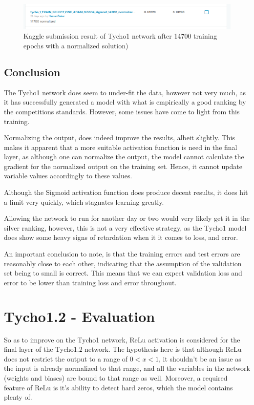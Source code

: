 \documentclass[12pt,a4paper,oneside,oldfontcommands]{memoir}
\begin{document}
\begin{Declaration Of OriginalityOrginality}
\begin{figure}[H]
  \centering
    \includegraphics[width=\linewidth]{images/tycho1_result.png}
    \caption{Kaggle submission result of Tycho1 network after 14700 training epochs with a normalized solution)}
   \label{fig:tycho-1-solution}
\end{figure}

\section{Conclusion}

The Tycho1 network does seem to under-fit the data, however not very much, as it has successfully generated a model with what is empirically a good ranking by the competitions standards. However, some issues have come to light from this training.

Normalizing the output, does indeed improve the results, albeit slightly. This makes it apparent that a more suitable activation function is need in the final layer, as although one can normalize the output, the model cannot calculate the gradient for the normalized output on the training set. Hence, it cannot update variable values accordingly to these values. 

Although the Sigmoid activation function does produce decent results, it does hit a limit very quickly, which stagnates
learning greatly.

Allowing the network to run for another day or two would very likely get it in the silver ranking, however, this is not a very effective strategy, as the Tycho1 model does show some heavy signs of retardation when it it comes to loss, and error.

An important conclusion to note, is that the training errors and test errors are reasonably close to each other, indicating that the assumption of the validation set being to small is correct. This means that we can expect validation loss and error to be lower than training loss and error throughout.

\chapter{Tycho1.2 - Evaluation} \label{tycho1.2}

So as to improve on the Tycho1 network, ReLu activation is considered for the final layer of the Tycho1.2 network. The hypothesis here is that although ReLu does not restrict the output to a range of \(0 < x < 1\), it shouldn't be an issue as the input is already normalized to that range, and all the variables in the network (weights and biases) are bound to that range as well. Moreover, a required feature of ReLu is it's ability to detect hard zeros, which the model contains plenty of.


\end{Declaration Of OriginalityOrginality}
\end{document}
